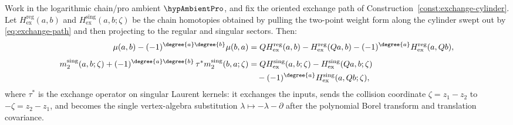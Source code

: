 \begin{lemma}
\label{lem:PVA2_proof}
Work in the logarithmic chain/pro ambient \(\hypAmbientPro\), and fix
the oriented exchange path of Construction~\ref{const:exchange-cylinder}.
Let $H^{\mathrm{reg}}_{\mathrm{ex}}(a,b)$ and
$H^{\mathrm{sing}}_{\mathrm{ex}}(a,b;\zeta)$ be the chain homotopies obtained by
pulling the two-point weight form along the cylinder swept out by
\eqref{eq:exchange-path} and then projecting to the regular and singular sectors.
Then:
\begin{align}
\label{eq:exchange-reg}
\mu(a,b)-(-1)^{\degree{a}\degree{b}}\mu(b,a)
&=
QH^{\mathrm{reg}}_{\mathrm{ex}}(a,b)
-H^{\mathrm{reg}}_{\mathrm{ex}}(Qa,b)
-(-1)^{\degree{a}}H^{\mathrm{reg}}_{\mathrm{ex}}(a,Qb),\\[4pt]
\label{eq:exchange-sing}
m_2^{\mathrm{sing}}(a,b;\zeta)
+(-1)^{\degree{a}\degree{b}}
\,\tau^\ast m_2^{\mathrm{sing}}(b,a;\zeta)
&=
QH^{\mathrm{sing}}_{\mathrm{ex}}(a,b;\zeta)
-H^{\mathrm{sing}}_{\mathrm{ex}}(Qa,b;\zeta) \notag\\
&\quad
-(-1)^{\degree{a}}H^{\mathrm{sing}}_{\mathrm{ex}}(a,Qb;\zeta),
\end{align}
where $\tau^\ast$ is the exchange operator on singular Laurent kernels:
it exchanges the inputs, sends the collision coordinate
\(\zeta=z_1-z_2\) to \(-\zeta=z_2-z_1\), and becomes the single
vertex-algebra substitution \(\lambda\mapsto-\lambda-\partial\) after
the polynomial Borel transform and translation covariance.
\end{lemma}

